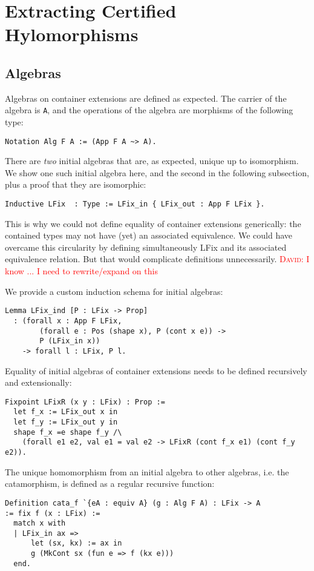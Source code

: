 \documentclass[a4paper, UKenglish, cleveref, autoref, thm-restate]{lipics-v2021}
\newcommand{\dcas}[1]{\textcolor{red}{\textsc{David}: #1}}
\begin{document}
\section{Extracting Certified Hylomorphisms}

\subsection{Algebras}

Algebras on container extensions are defined as expected. The carrier of the
algebra is \texttt{A}, and the operations of the algebra are
morphisms of the following type:
\begin{verbatim}
Notation Alg F A := (App F A ~> A).
\end{verbatim}

There are \emph{two} initial algebras that are, as expected, unique up to
isomorphism. We show one such initial algebra here, and the second in the
following subsection, plus a proof that they are isomorphic:

\begin{verbatim}
Inductive LFix  : Type := LFix_in { LFix_out : App F LFix }.
\end{verbatim}
This is why we could not define equality of container extensions generically:
the contained types may not have (yet) an associated equivalence. We could have
overcame this circularity by defining simultaneously LFix and its associated
equivalence relation. But that would complicate definitions unnecessarily.
\dcas{I know ... I need to rewrite/expand on this}

We provide a custom induction schema for initial algebras:

\begin{verbatim}
Lemma LFix_ind [P : LFix -> Prop]
  : (forall x : App F LFix,
        (forall e : Pos (shape x), P (cont x e)) ->
        P (LFix_in x))
    -> forall l : LFix, P l.
\end{verbatim}

Equality of initial algebras of container extensions needs to be defined
recursively and extensionally:
\begin{verbatim}
Fixpoint LFixR (x y : LFix) : Prop :=
  let f_x := LFix_out x in
  let f_y := LFix_out y in
  shape f_x =e shape f_y /\
    (forall e1 e2, val e1 = val e2 -> LFixR (cont f_x e1) (cont f_y e2)).
\end{verbatim}

The unique homomorphism from an initial algebra to other algebras, i.e. the catamorphism, is defined as a
regular recursive function:
\begin{verbatim}
Definition cata_f `{eA : equiv A} (g : Alg F A) : LFix -> A
:= fix f (x : LFix) :=
  match x with
  | LFix_in ax =>
      let (sx, kx) := ax in
      g (MkCont sx (fun e => f (kx e)))
  end.
\end{verbatim}
\end{document}
